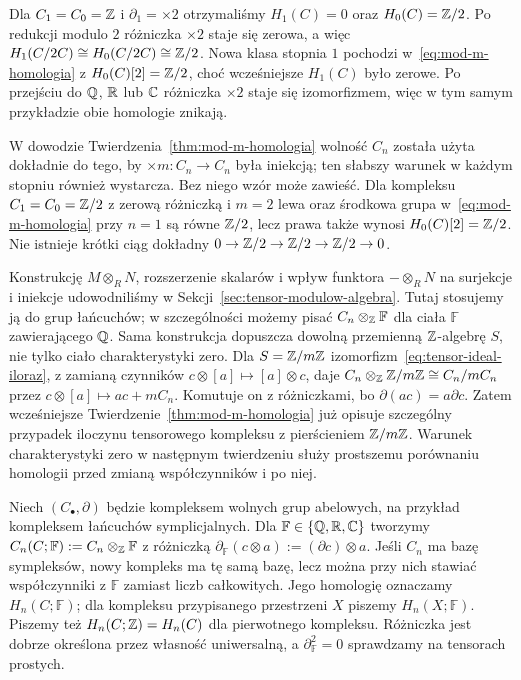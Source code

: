 \begin{przyklad}
Dla $C_1=C_0=\mathbb{Z}$ i $\partial_1=\times2$
otrzymaliśmy $H_1(C)=0$ oraz
$H_0(C)=\mathbb{Z}/2$. Po redukcji modulo
$2$ różniczka $\times2$ staje się
zerowa, a więc
$H_1(C/2C)\cong H_0(C/2C)\cong\mathbb{Z}/2$.
Nowa klasa stopnia $1$ pochodzi
w~\eqref{eq:mod-m-homologia} z
$H_0(C)[2]=\mathbb{Z}/2$, choć wcześniejsze
$H_1(C)$ było zerowe.
Po przejściu do $\mathbb{Q}$, $\mathbb{R}$ lub $\mathbb{C}$
różniczka $\times2$ staje się izomorfizmem,
więc w tym samym przykładzie obie homologie znikają.
\end{przyklad}

\begin{uwaga}
W dowodzie Twierdzenia~\ref{thm:mod-m-homologia}
wolność $C_n$ została użyta dokładnie do tego,
by $\times m:C_n\to C_n$ była iniekcją;
ten słabszy warunek w każdym stopniu również wystarcza.
Bez niego wzór może zawieść. Dla kompleksu
$C_1=C_0=\mathbb{Z}/2$ z zerową różniczką i $m=2$
lewa oraz środkowa grupa w~\eqref{eq:mod-m-homologia}
przy $n=1$ są równe $\mathbb{Z}/2$, lecz prawa także wynosi
$H_0(C)[2]=\mathbb{Z}/2$. Nie istnieje krótki ciąg dokładny
$0\to\mathbb{Z}/2\to\mathbb{Z}/2\to\mathbb{Z}/2\to0$.
\end{uwaga}

\begin{uwaga}
\label{uwaga:tensor-modulow}
Konstrukcję $M\otimes_R N$, rozszerzenie skalarów
i wpływ funktora $-\otimes_R N$ na surjekcje i iniekcje
udowodniliśmy w Sekcji~\ref{sec:tensor-modulow-algebra}.
Tutaj stosujemy ją do grup łańcuchów; w szczególności
możemy pisać $C_n\otimes_{\mathbb{Z}}\mathbb F$ dla ciała
$\mathbb F$ zawierającego $\mathbb{Q}$.
Sama konstrukcja dopuszcza dowolną przemienną $\mathbb{Z}$-algebrę $S$,
nie tylko ciało charakterystyki zero. Dla $S=\mathbb{Z}/m\mathbb{Z}$
izomorfizm~\eqref{eq:tensor-ideal-iloraz}, z zamianą czynników
$c\otimes[a]\mapsto[a]\otimes c$, daje
$C_n\otimes_{\mathbb{Z}}\mathbb{Z}/m\mathbb{Z}\cong C_n/mC_n$ przez
$c\otimes[a]\mapsto ac+mC_n$.
Komutuje on z różniczkami, bo $\partial(ac)=a\partial c$.
Zatem wcześniejsze Twierdzenie~\ref{thm:mod-m-homologia}
już opisuje szczególny przypadek iloczynu tensorowego kompleksu
z pierścieniem $\mathbb{Z}/m\mathbb{Z}$.
Warunek charakterystyki zero w następnym twierdzeniu służy
prostszemu porównaniu homologii przed zmianą współczynników i po niej.
\end{uwaga}

\begin{definicja}
\label{def:homologia-ciala-char-zero}
Niech $(C_\bullet,\partial)$ będzie kompleksem
wolnych grup abelowych, na przykład
kompleksem łańcuchów symplicjalnych.
Dla $\mathbb F\in\{\mathbb{Q},\mathbb{R},\mathbb{C}\}$ tworzymy
$C_n(C;\mathbb F):=C_n\otimes_{\mathbb{Z}}\mathbb F$ z różniczką
$\partial_{\mathbb F}(c\otimes a):=(\partial c)\otimes a$.
Jeśli $C_n$ ma bazę sympleksów, nowy kompleks
ma tę samą bazę, lecz można przy nich stawiać
współczynniki z $\mathbb F$ zamiast liczb całkowitych.
Jego homologię oznaczamy $H_n(C;\mathbb F)$;
dla kompleksu przypisanego przestrzeni $X$
piszemy $H_n(X;\mathbb F)$.
Piszemy też $H_n(C;\mathbb{Z})=H_n(C)$ dla pierwotnego kompleksu.
Różniczka jest dobrze określona przez własność uniwersalną,
a $\partial_{\mathbb F}^2=0$ sprawdzamy na tensorach prostych.
\end{definicja}

